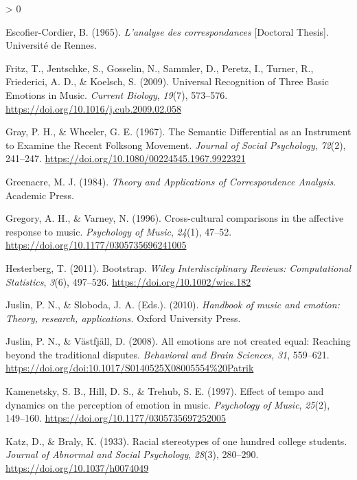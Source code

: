 \documentclass[
  english,
  man,floatsintext]{apa6}
\newlength{\cslhangindent}
\newenvironment{CSLReferences}[2] %
 {%
  \setlength{\parindent}{0pt}
  \ifodd #1 \everypar{\setlength{\hangindent}{\cslhangindent}}\ignorespaces\fi
  \ifnum #2 > 0
  \setlength{\parskip}{#2\baselineskip}
  \fi
 }%
 {}
\begin{document}
\begin{CSLReferences}{1}{0}
\leavevmode\hypertarget{ref-Escofier-Cordier1965}{}%
Escofier-Cordier, B. (1965). \emph{{L'analyse des correspondances}} {[}Doctoral Thesis{]}. Universit{é} de Rennes.

\leavevmode\hypertarget{ref-Fritz2009}{}%
Fritz, T., Jentschke, S., Gosselin, N., Sammler, D., Peretz, I., Turner, R., Friederici, A. D., \& Koelsch, S. (2009). {Universal Recognition of Three Basic Emotions in Music}. \emph{Current Biology}, \emph{19}(7), 573--576. \url{https://doi.org/10.1016/j.cub.2009.02.058}

\leavevmode\hypertarget{ref-Gray1967}{}%
Gray, P. H., \& Wheeler, G. E. (1967). {The Semantic Differential as an Instrument to Examine the Recent Folksong Movement}. \emph{Journal of Social Psychology}, \emph{72}(2), 241--247. \url{https://doi.org/10.1080/00224545.1967.9922321}

\leavevmode\hypertarget{ref-Greenacre1984}{}%
Greenacre, M. J. (1984). \emph{{Theory and Applications of Correspondence Analysis}}. Academic Press.

\leavevmode\hypertarget{ref-Gregory1996}{}%
Gregory, A. H., \& Varney, N. (1996). {Cross-cultural comparisons in the affective response to music}. \emph{Psychology of Music}, \emph{24}(1), 47--52. \url{https://doi.org/10.1177/0305735696241005}

\leavevmode\hypertarget{ref-Hesterberg2011}{}%
Hesterberg, T. (2011). {Bootstrap}. \emph{Wiley Interdisciplinary Reviews: Computational Statistics}, \emph{3}(6), 497--526. \url{https://doi.org/10.1002/wics.182}

\leavevmode\hypertarget{ref-Juslin2010}{}%
Juslin, P. N., \& Sloboda, J. A. (Eds.). (2010). \emph{{Handbook of music and emotion: Theory, research, applications.}} Oxford University Press.

\leavevmode\hypertarget{ref-Juslin2008a}{}%
Juslin, P. N., \& Västfjäll, D. (2008). {All emotions are not created equal: Reaching beyond the traditional disputes}. \emph{Behavioral and Brain Sciences}, \emph{31}, 559--621. \url{https://doi.org/doi:10.1017/S0140525X08005554\%20Patrik}

\leavevmode\hypertarget{ref-Kamenetsky1997}{}%
Kamenetsky, S. B., Hill, D. S., \& Trehub, S. E. (1997). {Effect of tempo and dynamics on the perception of emotion in music}. \emph{Psychology of Music}, \emph{25}(2), 149--160. \url{https://doi.org/10.1177/0305735697252005}

\leavevmode\hypertarget{ref-Katz1933}{}%
Katz, D., \& Braly, K. (1933). {Racial stereotypes of one hundred college students}. \emph{Journal of Abnormal and Social Psychology}, \emph{28}(3), 280--290. \url{https://doi.org/10.1037/h0074049}


\end{CSLReferences}
\end{document}
